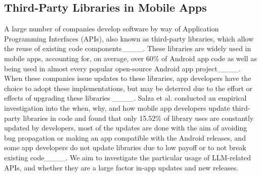 


\subsection{Third-Party Libraries in Mobile Apps}
A large number of companies develop software by way of Application Programming Interfaces (APIs), also known as third-party libraries, which allow the reuse of existing code components____. These libraries are widely used in mobile apps, accounting for, on average, over 60\% of Android app code as well as being used in almost every popular open-source Android app project____. When these companies issue updates to these libraries, app developers have the choice to adopt these implementations, but may be deterred due to the effort or effects of upgrading these libraries ____. %
Salza et al. conducted an empirical investigation into the when, why, and how mobile app developers update third-party libraries in code and found that only 15.52\% of library uses are constantly updated by developers, most of the updates are done with the aim of avoiding bug propagation or making an app compatible with the Android releases, and some app developers do not update libraries due to low payoff or to not break existing code____. We aim to investigate the particular usage of LLM-related APIs, and whether they are a large factor in-app updates and new releases.






